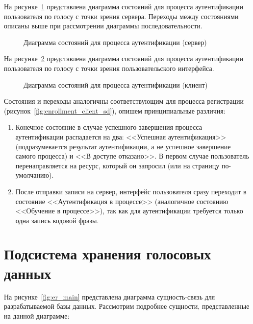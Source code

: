 На рисунке~\ref{fig:verification_server_sd} представлена диаграмма состояний
для процесса аутентификации пользователя по голосу с точки зрения сервера.
Переходы между состояниями описаны выше при рассмотрении диаграммы
последовательности.

\begin{figure}
    \caption{Диаграмма состояний для процесса аутентификации (сервер)}
    \label{fig:verification_server_sd}
\end{figure}

На рисунке~\ref{fig:verification_client_sd} представлена диаграмма состояний для
процесса аутентификации пользователя по голосу с точки зрения пользовательского
интерфейса.

\begin{figure}[htp!]
    \caption{Диаграмма состояний для процесса аутентификации (клиент)}
    \label{fig:verification_client_sd}
\end{figure}

Состояния и переходы аналогичны соответствующим для процесса регистрации
(рисунок~\ref{fig:enrollment_client_sd}), опишем принципиальные различия:

\begin{enumerate}
\item Конечное состояние в случае успешного завершения процесса аутентификации
распадается на два: <<Успешная аутентификация>> (подразумевается результат
аутентификации, а не успешное завершение самого процесса) и <<В доступе
отказано>>. В первом случае пользователь перенаправляется на ресурс,
который он запросил (или на страницу по-умолчанию).
\item После отправки записи на сервер, интерфейс пользователя сразу переходит в
состояние <<Аутентификация в процессе>> (аналогичное состоянию <<Обучение в
процессе>>), так как для аутентификации требуется только одна запись кодовой
фразы.
\end{enumerate}

\section{Подсистема хранения голосовых данных}
\label{sec:construct:db}

На рисунке~\ref{fig:er_main} представлена диаграмма сущность-связь для разрабатываемой базы данных. Рассмотрим подробнее сущности, представленные на данной диаграмме:

